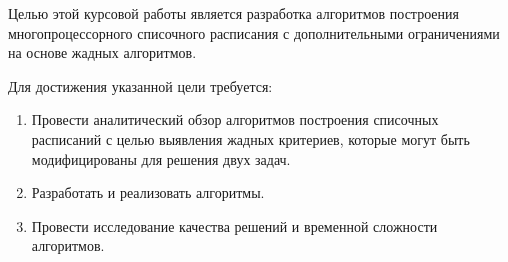 Целью этой курсовой работы является разработка алгоритмов построения многопроцессорного списочного расписания с дополнительными ограничениями на основе жадных алгоритмов.

Для достижения указанной цели требуется:
\begin{enumerate}
    \item Провести аналитический обзор алгоритмов построения списочных расписаний с целью выявления жадных критериев, которые могут быть модифицированы для решения двух задач.
    \item Разработать и реализовать алгоритмы.
    \item Провести исследование качества решений и временной сложности алгоритмов.
\end{enumerate}